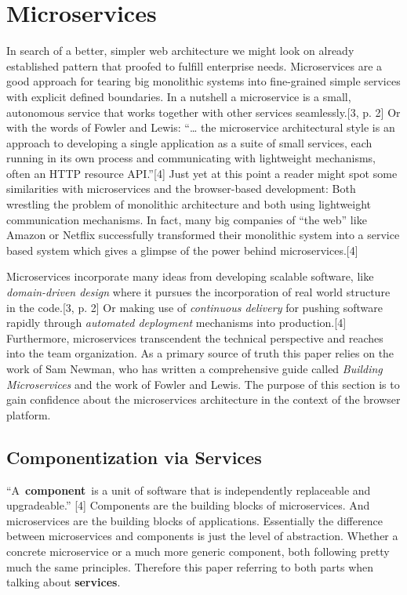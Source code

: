 \documentclass[]{article}
\begin{document}
\section{Microservices}\label{microservices}

In search of a better, simpler web architecture we might look on already
established pattern that proofed to fulfill enterprise needs.
Microservices are a good approach for tearing big monolithic systems
into fine-grained simple services with explicit defined boundaries. In a
nutshell a microservice is a small, autonomous service that works
together with other services seamlessly.{[}3, p. 2{]} Or with the words
of Fowler and Lewis: ``\ldots{} the microservice architectural style is
an approach to developing a single application as a suite of small
services, each running in its own process and communicating with
lightweight mechanisms, often an HTTP resource API.''{[}4{]} Just yet at
this point a reader might spot some similarities with microservices and
the browser-based development: Both wrestling the problem of monolithic
architecture and both using lightweight communication mechanisms. In
fact, many big companies of ``the web'' like Amazon or Netflix
successfully transformed their monolithic system into a service based
system which gives a glimpse of the power behind microservices.{[}4{]}

Microservices incorporate many ideas from developing scalable software,
like \emph{domain-driven design} where it pursues the incorporation of
real world structure in the code.{[}3, p. 2{]} Or making use of
\emph{continuous delivery} for pushing software rapidly through
\emph{automated deployment} mechanisms into production.{[}4{]}
Furthermore, microservices transcendent the technical perspective and
reaches into the team organization. As a primary source of truth this
paper relies on the work of Sam Newman, who has written a comprehensive
guide called \emph{Building Microservices} and the work of Fowler and
Lewis. The purpose of this section is to gain confidence about the
microservices architecture in the context of the browser platform.

\subsection{Componentization via
Services}\label{componentization-via-services}

``A~\textbf{component}~is a unit of software that is independently
replaceable and upgradeable.'' {[}4{]} Components are the building
blocks of microservices. And microservices are the building blocks of
applications. Essentially the difference between microservices and
components is just the level of abstraction. Whether a concrete
microservice or a much more generic component, both following pretty
much the same principles. Therefore this paper referring to both parts
when talking about \textbf{services}.
\end{document}
